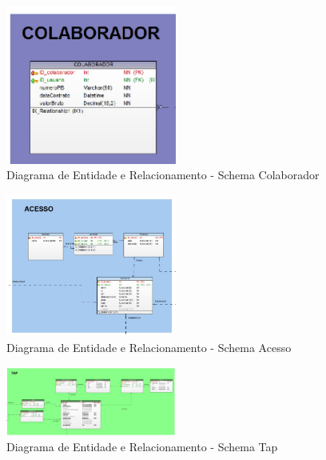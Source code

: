 \documentclass{acm_proc_article-sp}
\begin{document}
\begin{appendices}
\begin{figure}[h]
\centering %
\includegraphics[width=0.5\textwidth]{DER_colaborador.jpg} %
\caption{Diagrama de Entidade e Relacionamento - Schema Colaborador}
\end{figure}

\begin{figure}[h]
\centering %
\includegraphics[width=0.5\textwidth]{DER_acesso.jpg} %
\caption{Diagrama de Entidade e Relacionamento - Schema Acesso}
\end{figure} 

\begin{figure}[h]
\centering %
\includegraphics[width=0.5\textwidth]{DER_tap.jpg} %
\caption{Diagrama de Entidade e Relacionamento - Schema Tap}
\end{figure}


\end{appendices}
\end{document}
